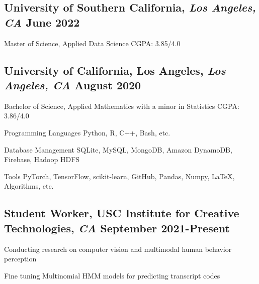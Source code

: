 \documentclass[11pt]{article}
\begin{document}
\subsection*{University of Southern California{\normalfont, \textit{Los Angeles, CA} \hfill June 2022}}
\noindent
Master of Science, Applied Data Science
\hfill
CGPA: 3.85/4.0

\vspace{0.1in}

\subsection*{University of California, Los Angeles{\normalfont, \textit{Los Angeles, CA} \hfill August 2020}}
\noindent
Bachelor of Science, Applied Mathematics with a minor in Statistics 
\hfill 
CGPA: 3.86/4.0

\vspace{0.1in}

\begin{compactdesc}
    \item[Programming Languages] Python, R, C++, Bash, etc.
    \item[Database Management] SQLite, MySQL, MongoDB, Amazon DynamoDB, Firebase, Hadoop HDFS
    \item[Tools] PyTorch, TensorFlow, scikit-learn, GitHub, Pandas, Numpy, \LaTeX, 
    Algorithms, etc.
\end{compactdesc}
\vspace{0.1in}

\subsection*{Student Worker{\normalfont, USC Institute for Creative 
Technologies, 
		\textit{CA} \hfill 
		September 2021-Present}}
\begin{compactitem}
	\item Conducting research on computer vision and multimodal 
	human behavior perception
	\item Fine tuning Multinomial HMM models for predicting transcript codes
\end{compactitem}
\vspace{0.1in}
\end{document}
